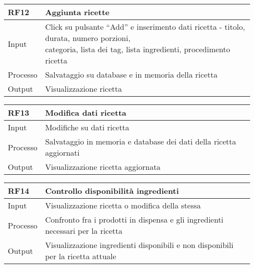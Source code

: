 \begin{table}[H]
    \begin{flushleft}
      \begin{tabular}{l|l}
        \toprule
        \textbf{RF12} & \textbf{Aggiunta ricette}\\
        \midrule
        Input & \makecell{Click su pulsante “Add” e inserimento dati ricetta - titolo, durata, numero porzioni, \\ categoria, lista dei tag, lista ingredienti, procedimento ricetta}\\
        Processo & Salvataggio su database e in memoria della ricetta\\
        Output & Visualizzazione ricetta\\
        \bottomrule
      \end{tabular}
    \end{flushleft}
\end{table}

\begin{table}[H]
    \begin{flushleft}
      \begin{tabular}{l|l}
        \toprule
        \textbf{RF13} & \textbf{Modifica dati ricetta}\\
        \midrule
        Input & Modifiche su dati ricetta\\
        Processo & Salvataggio in memoria e database dei dati della ricetta aggiornati\\
        Output & Visualizzazione ricetta aggiornata\\
        \bottomrule
      \end{tabular}
    \end{flushleft}
\end{table}

\begin{table}[H]
    \begin{flushleft}
      \begin{tabular}{l|l}
        \toprule
        \textbf{RF14} & \textbf{Controllo disponibilità ingredienti}\\
        \midrule
        Input & Visualizzazione ricetta o modifica della stessa\\
        Processo & Confronto fra i prodotti in dispensa e gli ingredienti necessari per la ricetta\\
        Output & Visualizzazione ingredienti disponibili e non disponibili per la ricetta attuale\\
        \bottomrule
      \end{tabular}
    \end{flushleft}
\end{table}

